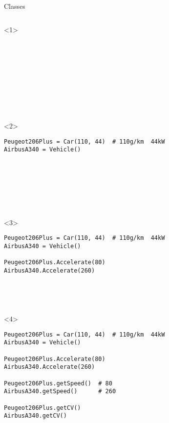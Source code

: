\begin{frame}[fragile]{Classes}

  \begin{columns}[onlytextwidth]
    \begin{column}{\textwidth}

      \begin{onlyenv}<1>
        \begin{lstlisting}[style=python]










 \end{lstlisting}
      \end{onlyenv}

      \begin{onlyenv}<2>
        \begin{lstlisting}[style=python]
Peugeot206Plus = Car(110, 44)  # 110g/km  44kW
AirbusA340 = Vehicle()








 \end{lstlisting}
      \end{onlyenv}

      \begin{onlyenv}<3>
        \begin{lstlisting}[style=python]
Peugeot206Plus = Car(110, 44)  # 110g/km  44kW
AirbusA340 = Vehicle()

Peugeot206Plus.Accelerate(80)
AirbusA340.Accelerate(260)





 \end{lstlisting}
      \end{onlyenv}

      \begin{onlyenv}<4>
        \begin{lstlisting}[style=python]
Peugeot206Plus = Car(110, 44)  # 110g/km  44kW
AirbusA340 = Vehicle()

Peugeot206Plus.Accelerate(80)
AirbusA340.Accelerate(260)

Peugeot206Plus.getSpeed()  # 80
AirbusA340.getSpeed()      # 260

Peugeot206Plus.getCV()
AirbusA340.getCV() \end{lstlisting}
      \end{onlyenv}



\end{column}
\end{columns}
\end{frame}
